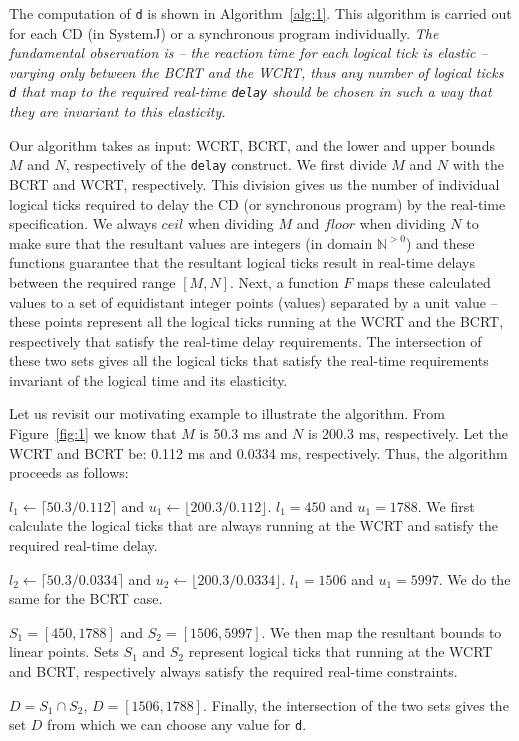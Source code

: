 The computation of \texttt{d} is shown in Algorithm~\ref{alg:1}. This
algorithm is carried out for each CD (in SystemJ) or a synchronous
program individually. \textit{The fundamental observation is -- the
  reaction time for each logical tick is elastic -- varying only between
  the BCRT and the WCRT, thus any number of logical ticks \texttt{d}
  that map to the required real-time \texttt{delay} should be chosen in
  such a way that they are invariant to this elasticity.}

Our algorithm takes as input: WCRT, BCRT, and the lower and upper bounds
$M$ and $N$, respectively of the \texttt{delay} construct. We first
divide $M$ and $N$ with the BCRT and WCRT, respectively. This division
gives us the number of individual logical ticks required to delay the CD
(or synchronous program) by the real-time specification. We always
$ceil$ when dividing $M$ and $floor$ when dividing $N$ to make sure that
the resultant values are integers (in domain $\mathbb{N}^{>0}$) and
these functions guarantee that the resultant logical ticks result in
real-time delays between the required range $[M,N]$. Next, a function
$F$ maps these calculated values to a set of equidistant integer points
(values) separated by a unit value -- these points represent all the
logical ticks running at the WCRT and the BCRT, respectively that
satisfy the real-time delay requirements. The intersection of these two
sets gives all the logical ticks that satisfy the real-time requirements
invariant of the logical time and its elasticity.

Let us revisit our motivating example to illustrate the algorithm. From
Figure~\ref{fig:1} we know that $M$ is 50.3 ms and $N$ is 200.3 ms,
respectively. Let the WCRT and BCRT be: 0.112 ms and 0.0334 ms,
respectively. Thus, the algorithm proceeds as follows:

\begin{enumerate*}
\item $l_1 \leftarrow \lceil 50.3/0.112 \rceil$ and $u_1 \leftarrow
  \lfloor 200.3/0.112 \rfloor$. $l_1 = 450$ and $u_1 = 1788$. We first
  calculate the logical ticks that are always running at the WCRT and
  satisfy the required real-time delay.
\item $l_2 \leftarrow \lceil 50.3/0.0334 \rceil$ and $u_2 \leftarrow
  \lfloor 200.3/0.0334 \rfloor$. $l_1 = 1506$ and $u_1 = 5997$. We do
  the same for the BCRT case.
\item $S_1 = [450,1788]$ and $S_2 =[1506,5997]$. We then map the
  resultant bounds to linear points. Sets $S_1$ and $S_2$ represent
  logical ticks that running at the WCRT and BCRT, respectively always
  satisfy the required real-time constraints.
\item $D = S_1 \cap S_2$, $D = [1506,1788]$. Finally, the intersection
  of the two sets gives the set $D$ from which we can choose any value
  for \texttt{d}.
\end{enumerate*}

